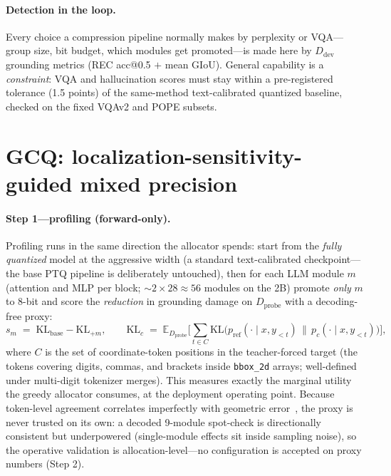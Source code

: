 \documentclass{article}
\newcommand{\bbox}{\texttt{bbox\_2d}}
\begin{document}
\paragraph{Detection in the loop.} Every choice a compression pipeline normally makes by perplexity or VQA---group size, bit budget, which modules get promoted---is made here by $D_{\text{dev}}$ grounding metrics (REC acc@0.5 $+$ mean GIoU). General capability is a \emph{constraint}: VQA and hallucination scores must stay within a pre-registered tolerance (1.5 points) of the same-method text-calibrated quantized baseline, checked on the fixed VQAv2 and POPE subsets.

\section{GCQ: localization-sensitivity-guided mixed precision}
\label{sec:method}

\paragraph{Step 1---profiling (forward-only).} Profiling runs in the same direction the allocator spends: start from the \emph{fully quantized} model at the aggressive width (a standard text-calibrated checkpoint---the base PTQ pipeline is deliberately untouched), then for each LLM module $m$ (attention and MLP per block; ${\sim}2{\times}28 \approx 56$ modules on the 2B) promote \emph{only} $m$ to 8-bit and score the \emph{reduction} in grounding damage on $D_{\text{probe}}$ with a decoding-free proxy:
\begin{equation}
s_m \;=\; \mathrm{KL}_{\text{base}} - \mathrm{KL}_{+m}, \qquad
\mathrm{KL}_{c} \;=\; \mathbb{E}_{D_{\text{probe}}}\Big[\textstyle\sum_{t \in C} \mathrm{KL}\big(p_{\text{ref}}(\cdot \mid x, y_{<t}) \,\|\, p_{c}(\cdot \mid x, y_{<t})\big)\Big],
\end{equation}
where $C$ is the set of coordinate-token positions in the teacher-forced target (the tokens covering digits, commas, and brackets inside \bbox{} arrays; well-defined under multi-digit tokenizer merges). This measures exactly the marginal utility the greedy allocator consumes, at the deployment operating point. Because token-level agreement correlates imperfectly with geometric error~\cite{groundingtokens}, the proxy is never trusted on its own: a decoded 9-module spot-check is directionally consistent but underpowered (single-module effects sit inside sampling noise), so the operative validation is allocation-level---no configuration is accepted on proxy numbers (Step 2).
\end{document}

